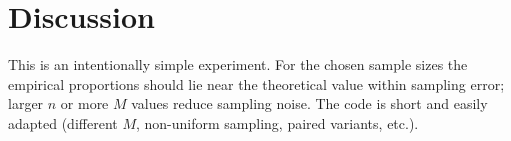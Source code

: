 \documentclass[11pt]{article}
\begin{document}
\section{Discussion}
This is an intentionally simple experiment. For the chosen sample sizes
the empirical proportions should lie near the theoretical value within
sampling error; larger \(n\) or more \(M\) values reduce sampling noise.
The code is short and easily adapted (different \(M\), non-uniform
sampling, paired variants, etc.).
\end{document}
